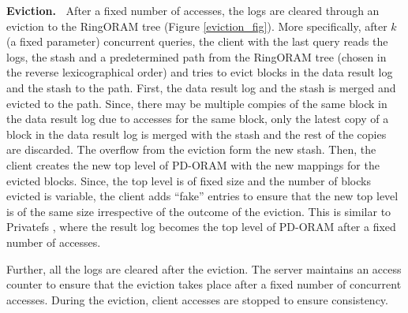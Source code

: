 {\bf Eviction.~}
After a fixed number of accesses, the logs are cleared through an eviction to the 
RingORAM tree (Figure \ref{eviction_fig}). 
More specifically, after $k$ (a fixed parameter) concurrent queries,  
the client with the last query reads the logs, the stash and a predetermined path 
from the RingORAM tree (chosen in the reverse lexicographical order) 
and tries to evict blocks in the data result log and the stash 
to the path. First, the data result log and the stash is merged and evicted to the path. 
Since, there may be multiple compies of the same block in the data result log due to accesses for the same 
block, only the latest copy of a block in the data result log is merged with the stash and the rest of the copies are discarded. 
The overflow from the eviction form the new stash. Then, the client creates the new top level 
of PD-ORAM with the new mappings for the evicted blocks. Since, the top level is of fixed size and 
the number of blocks evicted is variable, the client adds ``fake'' entries to ensure that the new top level is 
of the same size irrespective of the outcome of the eviction.  This is similar to Privatefs \cite{privatefs}, 
where the result log becomes the top level of PD-ORAM after a fixed number of accesses. 

Further, all the logs are cleared after the eviction. The server maintains an access counter 
to ensure that the eviction takes place after a fixed number of concurrent accesses. During the eviction, 
client accesses are stopped to ensure consistency. 

